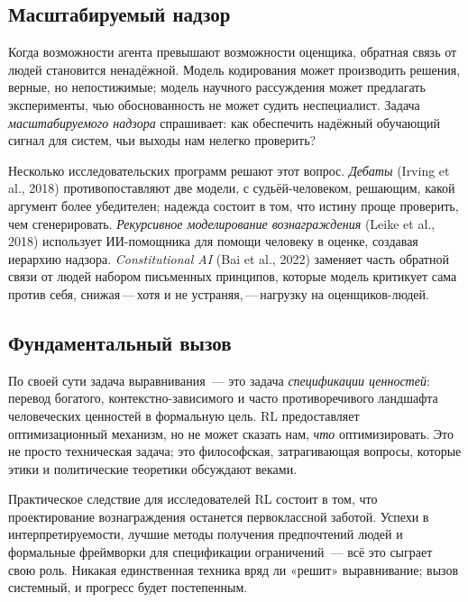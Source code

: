 \subsection{Масштабируемый надзор}

Когда возможности агента превышают возможности оценщика, обратная связь от людей
становится ненадёжной. Модель кодирования может производить решения, верные, но непостижимые;
модель научного рассуждения может предлагать эксперименты, чью обоснованность
не может судить неспециалист. Задача \emph{масштабируемого надзора} спрашивает:
как обеспечить надёжный обучающий сигнал для систем, чьи выходы нам нелегко проверить?

Несколько исследовательских программ решают этот вопрос. \emph{Дебаты}
(Irving et al., 2018) противопоставляют две модели, с
судьёй-человеком, решающим, какой аргумент более убедителен; надежда
состоит в том, что истину проще проверить, чем сгенерировать.
\emph{Рекурсивное моделирование вознаграждения} (Leike et al., 2018) использует
ИИ-помощника для помощи человеку в оценке, создавая иерархию
надзора. \emph{Constitutional AI} (Bai et al., 2022) заменяет
часть обратной связи от людей набором письменных принципов, которые модель
критикует сама против себя, снижая\,---\,хотя и не
устраняя,\,---\,нагрузку на оценщиков-людей.

\subsection{Фундаментальный вызов}

По своей сути задача выравнивания~--- это задача \emph{спецификации
ценностей}: перевод богатого,
контекстно-зависимого и часто противоречивого ландшафта человеческих ценностей
в формальную цель. RL предоставляет оптимизационный механизм, но
не может сказать нам, \emph{что} оптимизировать. Это не просто
техническая задача; это философская, затрагивающая вопросы,
которые этики и политические теоретики обсуждают веками.

Практическое следствие для исследователей RL состоит в том, что проектирование вознаграждения
останется первоклассной заботой. Успехи в интерпретируемости,
лучшие методы получения предпочтений людей и формальные фреймворки
для спецификации ограничений~--- всё это сыграет свою роль. Никакая единственная техника
вряд ли «решит» выравнивание; вызов системный, и
прогресс будет постепенным.


